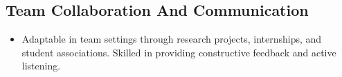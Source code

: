 \documentclass[a4paper]{article}
\begin{document}
\subsection{Team Collaboration And Communication}
\begin{itemize}
    \item Adaptable in team settings through research projects, internships, and student associations. Skilled in providing constructive feedback and active listening.
\end{itemize}

    
\end{document}
